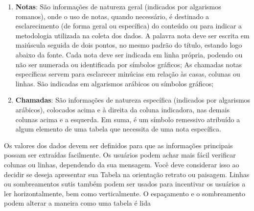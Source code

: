 \begin{enumerate}
  \item \textbf{Notas}: São informações de natureza geral (indicados por algarismos romanos), onde o uso de notas, quando necessário, é destinado a esclarecimento (de forma geral ou específica) do conteúdo ou para indicar a metodologia utilizada na coleta dos dados. A palavra nota deve ser escrita em maiúscula seguida de dois pontos, no mesmo padrão do título, estando logo abaixo da fonte. Cada nota deve ser indicada em linha própria, podendo ou não ser numerada ou identificada por símbolos gráficos; As chamadas notas específicas servem para esclarecer minúcias em relação às casas, colunas ou linhas. São indicadas em algarismos arábicos ou símbolos gráficos;
  \item \textbf{Chamadas}: São informações de natureza específica (indicados por algarismos arábicos), colocados acima
  e à direita da coluna indicadora, nas demais colunas acima e a esquerda.
  Em suma, é um símbolo remessivo atribuído a algum elemento de uma tabela
  que necessita de uma nota específica.
\end{enumerate}


\begin{figure}[!htb]
\end{figure}




\newpage
Os valores dos dados devem ser definidos para que as informações principais possam ser extraídas facilmente. Os usuários podem achar mais fácil verificar colunas ou linhas, dependendo da sua mensagem. Você deve considerar isso ao decidir se deseja apresentar sua Tabela na orientação retrato ou paisagem. Linhas ou sombreamentos sutis também podem ser usados para incentivar os usuários a ler horizontalmente, bem como verticalmente. O espaçamento e o sombreamento podem alterar a maneira como uma tabela é lida \vskip0.3cm



